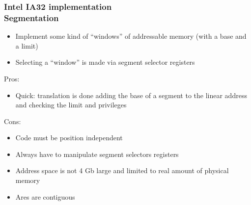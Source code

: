 \begin{frame}
  \frametitle{Intel IA32 implementation\\Segmentation}

  \begin{itemize}
  \item Implement some kind of ``windows'' of addressable memory (with a base and a limit)
  \item Selecting a ``window'' is made via segment selector registers
  \end{itemize}

  \-

  Pros:

  \begin{itemize}
  \item Quick: translation is done adding the base of a segment to the linear address and checking the limit and privileges
  \end{itemize}

  Cons:

  \begin{itemize}
  \item Code must be position independent
  \item Always have to manipulate segment selectors registers
  \item Address space is not 4 Gb large and limited to real amount of physical memory
  \item Ares are contiguous
  \end{itemize}

\end{frame}


